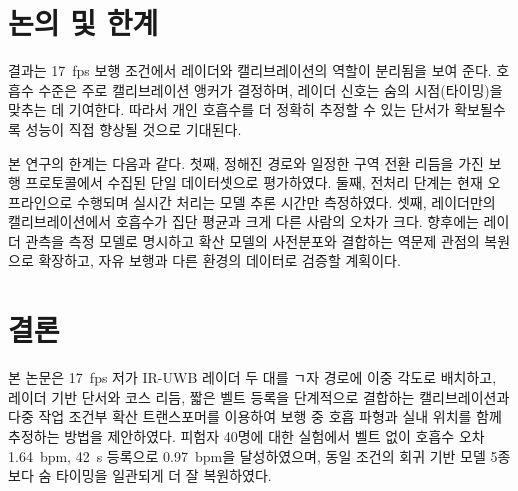 \documentclass{article}
\begin{document}
\section{논의 및 한계}
결과는 17~fps 보행 조건에서 레이더와 캘리브레이션의 역할이 분리됨을 보여 준다.
호흡수 수준은 주로 캘리브레이션 앵커가 결정하며, 레이더 신호는 숨의 시점(타이밍)을 맞추는 데 기여한다.
따라서 개인 호흡수를 더 정확히 추정할 수 있는 단서가 확보될수록 성능이 직접 향상될 것으로 기대된다.

본 연구의 한계는 다음과 같다. 첫째, 정해진 경로와 일정한 구역 전환 리듬을 가진 보행 프로토콜에서 수집된 단일 데이터셋으로 평가하였다.
둘째, 전처리 단계는 현재 오프라인으로 수행되며 실시간 처리는 모델 추론 시간만 측정하였다.
셋째, 레이더만의 캘리브레이션에서 호흡수가 집단 평균과 크게 다른 사람의 오차가 크다.
향후에는 레이더 관측을 측정 모델로 명시하고 확산 모델의 사전분포와 결합하는 역문제 관점의 복원으로 확장하고, 자유 보행과 다른 환경의 데이터로 검증할 계획이다.

\section{결론}
본 논문은 17~fps 저가 IR-UWB 레이더 두 대를 ㄱ자 경로에 이중 각도로 배치하고, 레이더 기반 단서와 코스 리듬, 짧은 벨트 등록을 단계적으로 결합하는 캘리브레이션과
다중 작업 조건부 확산 트랜스포머를 이용하여 보행 중 호흡 파형과 실내 위치를 함께 추정하는 방법을 제안하였다.
피험자 40명에 대한 실험에서 벨트 없이 호흡수 오차 1.64~bpm, 42~s 등록으로 0.97~bpm을 달성하였으며, 동일 조건의 회귀 기반 모델 5종보다 숨 타이밍을 일관되게 더 잘 복원하였다.
\end{document}
